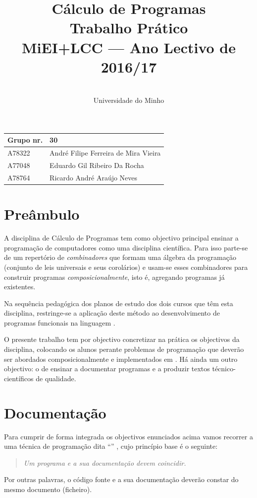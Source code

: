 \documentclass[a4paper]{article}
\title{
       	    Cálculo de Programas
\\
       	Trabalho Prático
\\
       	MiEI+LCC --- Ano Lectivo de 2016/17
}
\author{
       	\dium
\\
       	Universidade do Minho
}
\date\mydate
\begin{document}
\maketitle

\begin{center}\large
\begin{tabular}{ll}
\textbf{Grupo} nr. & 30
\\\hline
A78322 & André Filipe Ferreira de Mira Vieira	
\\
A77048 & Eduardo Gil Ribeiro Da Rocha	
\\
A78764 & Ricardo André Araújo Neves
\end{tabular}
\end{center}

\tableofcontents

\newpage

\section{Preâmbulo}

A disciplina de Cálculo de Programas tem como objectivo principal ensinar
a progra\-mação de computadores como uma disciplina científica. Para isso
parte-se de um repertório de \emph{combinadores} que formam uma álgebra da
programação (conjunto de leis universais e seus corolários) e usam-se esses
combinadores para construir programas \emph{composicionalmente}, isto é,
agregando programas já existentes.
  
Na sequência pedagógica dos planos de estudo dos dois cursos que têm esta
disciplina, restringe-se a aplicação deste método ao desenvolvimento de programas
funcionais na linguagem \Haskell.

O presente trabalho tem por objectivo concretizar na prática os objectivos
da disciplina, colocando os alunos perante problemas de programação que
deverão ser abordados composicionalmente e implementados em \Haskell.
Há ainda um outro objectivo: o de ensinar a documentar programas e
a produzir textos técnico-científicos de qualidade.

\section{Documentação}
Para cumprir de forma integrada os objectivos enunciados acima vamos recorrer
a uma técnica de programa\-ção dita ``'' \cite{Kn92}, cujo
princípio base é o seguinte:
\begin{quote}\em
Um programa e a sua documentação devem coincidir.
\end{quote}
Por outras palavras, o código fonte e a sua documentação deverão constar
do mesmo documento (ficheiro).
\end{document}
